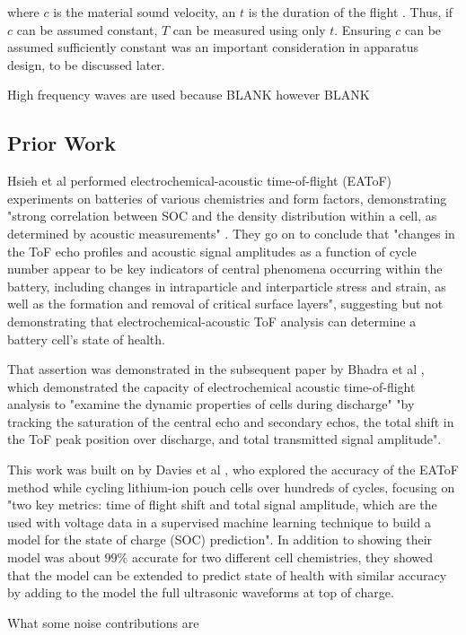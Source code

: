 where $c$ is the material sound velocity, an $t$ is the duration of the flight \cite{OLYMPUS}. 
Thus, if $c$ can be assumed constant, $T$ can be measured using only $t$.
Ensuring $c$ can be assumed sufficiently constant was an important consideration in apparatus design, to be discussed later.

High frequency waves are used because BLANK however BLANK

\subsection{Prior Work}

Hsieh et al  performed electrochemical-acoustic time-of-flight (EAToF) experiments on batteries of various chemistries and form factors, demonstrating "strong correlation between SOC and the density distribution within a cell, as determined by acoustic measurements" \cite{TOF-STATE}. They go on to conclude that "changes in the ToF echo profiles and acoustic signal amplitudes as a function of cycle number appear to be key indicators of central phenomena occurring within the battery, including changes in intraparticle and interparticle stress and strain, as well as the formation and removal of critical surface layers", suggesting but not demonstrating that electrochemical-acoustic ToF analysis can determine a battery cell's state of health.

That assertion was demonstrated in the subsequent paper by Bhadra et al  \cite{ANODE-CHAR}, which demonstrated the capacity of electrochemical acoustic time-of-flight analysis to "examine the dynamic properties of cells during discharge" "by tracking the saturation of the central echo and secondary echos, the total shift in the ToF peak position over discharge, and total transmitted signal amplitude".

This work was built on by Davies et al  \cite{SOC-SOH-EST}, who explored the accuracy of the EAToF method while cycling lithium-ion pouch cells over hundreds of cycles, focusing on "two key metrics: time of flight shift and total signal amplitude, which are the used with voltage data in a supervised machine learning technique to build a model for the state of charge (SOC) prediction". 
In addition to showing their model was about $99\%$ accurate for two different cell chemistries, they showed that the model can be extended to predict state of health with similar accuracy by adding to the model the full ultrasonic waveforms at top of charge.


What some noise contributions are